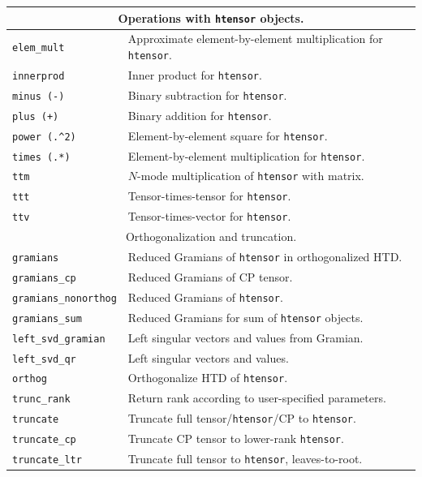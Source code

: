 \documentclass[11pt, a4paper]{article}
\begin{document}
\begin{preprint}
\begin{table} \small
  \begin{tabular}{|p{3.2cm}|p{11cm}|}
\hline
\multicolumn{2}{|c|}{Operations with \texttt{htensor} objects.} \\
\hline
\texttt{elem\_mult}         & Approximate element-by-element multiplication for {\tt htensor}.\\
\texttt{innerprod}          & Inner product for {\tt htensor}.\\
\texttt{minus (-)}          & Binary subtraction for {\tt htensor}.\\
\texttt{plus (+)}           & Binary addition for {\tt htensor}.\\
\texttt{power (.\^{}2)}     & Element-by-element square for {\tt htensor}.\\
\texttt{times (.*)}         & Element-by-element multiplication for {\tt htensor}.\\
\texttt{ttm}                & $N$-mode multiplication of {\tt htensor} with matrix.\\
\texttt{ttt}                & Tensor-times-tensor for {\tt htensor}.\\
\texttt{ttv}                & Tensor-times-vector for {\tt htensor}.\\
\hline \hline
\multicolumn{2}{|c|}{Orthogonalization and truncation.} \\
\hline
\texttt{gramians}           & Reduced Gramians of {\tt htensor} in orthogonalized HTD.\\
\texttt{gramians\_cp}       & Reduced Gramians of CP tensor.\\
\texttt{gramians\_nonorthog} & Reduced Gramians of {\tt htensor}.\\
\texttt{gramians\_sum}      & Reduced Gramians for sum of {\tt htensor} objects.\\
\texttt{left\_svd\_gramian} & Left singular vectors and values from Gramian.\\
\texttt{left\_svd\_qr}      & Left singular vectors and values.\\
\texttt{orthog}             & Orthogonalize HTD of {\tt htensor}.\\
\texttt{trunc\_rank}        & Return rank according to user-specified parameters.\\
\texttt{truncate}            & Truncate full tensor/{\tt htensor}/CP to {\tt htensor}.\\
\texttt{truncate\_cp}       & Truncate CP tensor to lower-rank {\tt htensor}. \\
\texttt{truncate\_ltr}      & Truncate full tensor to {\tt htensor}, leaves-to-root.\\

\end{tabular}
\end{table}
\end{preprint}
\end{document}
